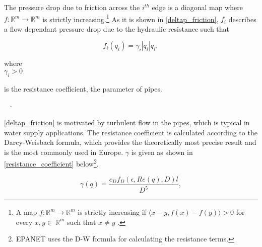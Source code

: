 The pressure drop due to friction across the $i^{th}$ edge is a diagonal map where $f: \mathbb{R}^{m} \rightarrow \mathbb{R}^{m} $ is strictly increasing.\footnote{A map $f: \mathbb{R}^{m} \rightarrow \mathbb{R}^{m} $ is strictly increasing if $\langle x-y, f(x)-f(y) \rangle > 0$ for every $x,y \in \: \mathbb{R}^{m}$ such that $x \neq y$ \cite{oneinput_paper}.} As it is shown in \eqref{deltap_friction}, $f_i$ describes a flow dependant pressure drop due to the hydraulic resistance such that

\begin{equation}
  \label{deltap_friction}
  f_i(q_i) = \gamma_i |q_i|q_i,
\end{equation}

 \begin{minipage}[t]{0.20\textwidth}
where\\
\hspace*{8mm} $\gamma_i > 0$ 
\end{minipage}
\begin{minipage}[t]{0.68\textwidth}
\vspace*{2mm}
is the resistance coefficient, the parameter of pipes. 
\end{minipage}
\begin{minipage}[t]{0.10\textwidth}
\vspace*{2mm}
\textcolor{White}{te}$\unit{\cdot}$
\end{minipage}

\eqref{deltap_friction} is motivated by turbulent flow in the pipes, which is typical in water supply applications. The resistance coefficient is calculated according to the Darcy-Weisbach formula, which provides the theoretically most precise result and is the most commonly used in Europe\cite{prahata,agency2016epanet}. $\gamma$ is given as shown in \eqref{resistance_coefficient} below\footnote{EPANET uses the D-W formula for calculating the resistance terms.}.  

\begin{equation}
  \label{resistance_coefficient}
  \gamma(q) = \frac{c_D f_{D}(\epsilon,Re(q), D )l}{D^{5}},
\end{equation}

